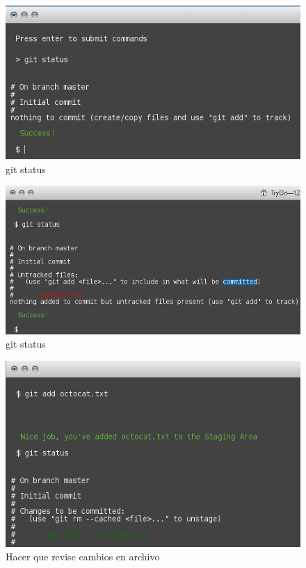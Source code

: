 \documentclass[11pt]{article}
\begin{document}
\begin{figure}[H]
	\centering
	\includegraphics[scale=0.8]{git_2.png}
	\caption{git status}
	\label{fig:c2}
\end{figure}

\begin{figure}[H]
	\centering
	\includegraphics[scale=0.8]{git_3.png}
	\caption{git status}
	\label{fig:c3}
\end{figure}

\begin{figure}[H]
	\centering
	\includegraphics[scale=0.8]{git_4.png}
	\caption{Hacer que revise cambios en archivo}
	\label{fig:c4}
\end{figure}
\end{document}
